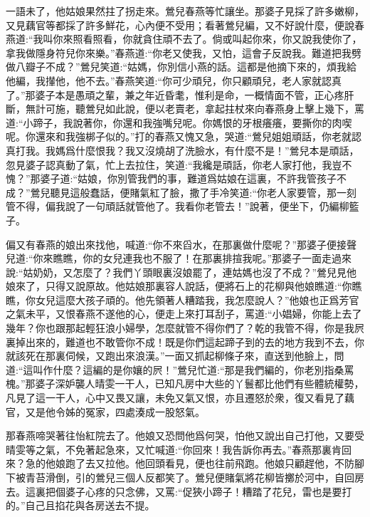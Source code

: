 \begin{parag}
    一語未了，他姑娘果然拄了拐走來。鶯兒春燕等忙讓坐。那婆子見採了許多嫩柳，又見藕官等都採了許多鮮花，心內便不受用；看著鶯兒編，又不好說什麼，便說春燕道:“我叫你來照看照看，你就貪住頑不去了。倘或叫起你來，你又說我使你了，拿我做隱身符兒你來樂。”春燕道:“你老又使我，又怕，這會子反說我。難道把我劈做八瓣子不成？”鶯兒笑道:“姑媽，你別信小燕的話。這都是他摘下來的，煩我給他編，我攆他，他不去。”春燕笑道:“你可少頑兒，你只顧頑兒，老人家就認真了。”那婆子本是愚頑之輩，兼之年近昏耄，惟利是命，一概情面不管，正心疼肝斷，無計可施，聽鶯兒如此說，便以老賣老，拿起拄杖來向春燕身上擊上幾下，罵道:“小蹄子，我說著你，你還和我強嘴兒呢。你媽恨的牙根癢癢，要撕你的肉喫呢。你還來和我強梆子似的。”打的春燕又愧又急，哭道:“鶯兒姐姐頑話，你老就認真打我。我媽爲什麼恨我？我又沒燒胡了洗臉水，有什麼不是！”鶯兒本是頑話，忽見婆子認真動了氣，忙上去拉住，笑道:“我纔是頑話，你老人家打他，我豈不愧？”那婆子道:“姑娘，你別管我們的事，難道爲姑娘在這裏，不許我管孩子不成？”鶯兒聽見這般蠢話，便賭氣紅了臉，撒了手冷笑道:“你老人家要管，那一刻管不得，偏我說了一句頑話就管他了。我看你老管去！”說著，便坐下，仍編柳籃子。
\end{parag}


\begin{parag}
    偏又有春燕的娘出來找他，喊道:“你不來舀水，在那裏做什麼呢？”那婆子便接聲兒道:“你來瞧瞧，你的女兒連我也不服了！在那裏排揎我呢。”那婆子一面走過來說:“姑奶奶，又怎麼了？我們丫頭眼裏沒娘罷了，連姑媽也沒了不成？”鶯兒見他娘來了，只得又說原故。他姑娘那裏容人說話，便將石上的花柳與他娘瞧道:“你瞧瞧，你女兒這麼大孩子頑的。他先領著人糟踏我，我怎麼說人？”他娘也正爲芳官之氣未平，又恨春燕不遂他的心，便走上來打耳刮子，罵道:“小娼婦，你能上去了幾年？你也跟那起輕狂浪小婦學，怎麼就管不得你們了？乾的我管不得，你是我屄裏掉出來的，難道也不敢管你不成！既是你們這起蹄子到的去的地方我到不去，你就該死在那裏伺候，又跑出來浪漢。”一面又抓起柳條子來，直送到他臉上，問道:“這叫作什麼？這編的是你孃的屄！”鶯兒忙道:“那是我們編的，你老別指桑罵槐。”那婆子深妒襲人晴雯一干人，已知凡房中大些的丫鬟都比他們有些體統權勢，凡見了這一干人，心中又畏又讓，未免又氣又恨，亦且遷怒於衆，復又看見了藕官，又是他令姊的冤家，四處湊成一股怒氣。
\end{parag}


\begin{parag}
    那春燕啼哭著往怡紅院去了。他娘又恐問他爲何哭，怕他又說出自己打他，又要受晴雯等之氣，不免著起急來，又忙喊道:“你回來！我告訴你再去。”春燕那裏肯回來？急的他娘跑了去又拉他。他回頭看見，便也往前飛跑。他娘只顧趕他，不防腳下被青苔滑倒，引的鶯兒三個人反都笑了。鶯兒便賭氣將花柳皆擲於河中，自回房去。這裏把個婆子心疼的只念佛，又罵:“促狹小蹄子！糟踏了花兒，雷也是要打的。”自己且掐花與各房送去不提。
\end{parag}


